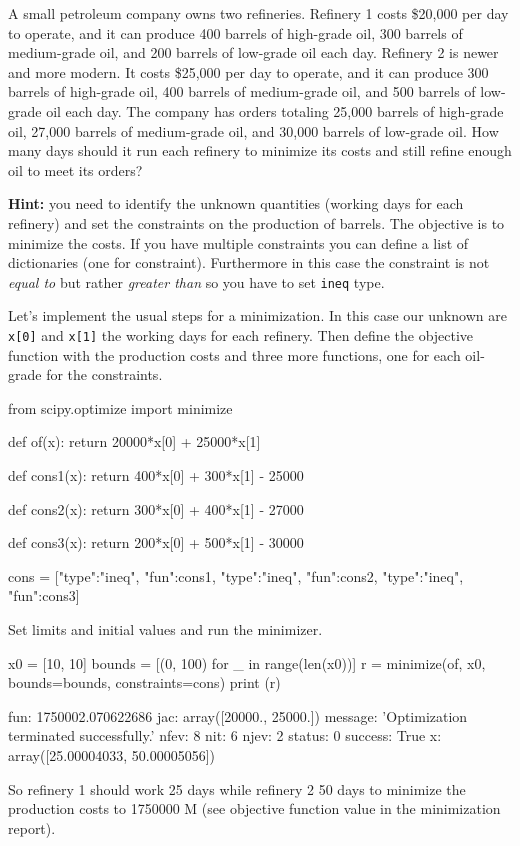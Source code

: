 \begin{question}
A small petroleum company owns two refineries. Refinery 1 costs \$20,000 per day to operate, and it can produce 400 barrels of high-grade oil, 300 barrels of medium-grade oil, and 200 barrels of low-grade oil each day. Refinery 2 is newer and more modern. It costs \$25,000 per day to operate, and it can produce 300 barrels of high-grade oil, 400 barrels of medium-grade oil, and 500 barrels of low-grade oil each day.
The company has orders totaling 25,000 barrels of high-grade oil, 27,000 barrels of medium-grade oil, and 30,000 barrels of low-grade oil. How many days should it run each refinery to minimize its costs and still refine enough oil to meet its orders?

\noindent\textbf{Hint:} you need to identify the unknown quantities (working days for each refinery) and set the constraints on the production of barrels. The objective is to minimize the costs. If you have multiple constraints you can define a list of dictionaries (one for constraint). Furthermore in this case the constraint is not \emph{equal to} but rather \emph{greater than} so you have to set \texttt{ineq} type.
\end{question}

\cprotEnv\begin{solution}
Let's implement the usual steps for a minimization. In this case our unknown are \texttt{x[0]} and \texttt{x[1]} the working days for each refinery. Then define the objective function with the production costs and three more functions, one for each oil-grade for the constraints.

\begin{ipython}
from scipy.optimize import minimize

def of(x):
    return 20000*x[0] + 25000*x[1]

def cons1(x):
    return 400*x[0] + 300*x[1] - 25000

def cons2(x):
    return 300*x[0] + 400*x[1] - 27000

def cons3(x):
    return 200*x[0] + 500*x[1] - 30000

cons = [{"type":"ineq", "fun":cons1},
        {"type":"ineq", "fun":cons2},
        {"type":"ineq", "fun":cons3}]
\end{ipython}
Set limits and initial values and run the minimizer.
\begin{ipython}
x0 = [10, 10]
bounds = [(0, 100) for _ in range(len(x0))]
r = minimize(of, x0, bounds=bounds, constraints=cons)
print (r)
\end{ipython}
\begin{ioutput}
     fun: 1750002.070622686
     jac: array([20000., 25000.])
 message: 'Optimization terminated successfully.'
    nfev: 8
     nit: 6
    njev: 2
  status: 0
 success: True
       x: array([25.00004033, 50.00005056])
\end{ioutput}    
So refinery 1 should work 25 days while refinery 2 50 days to minimize the production costs to 1750000 M (see objective function value in the minimization report).
\end{solution}

